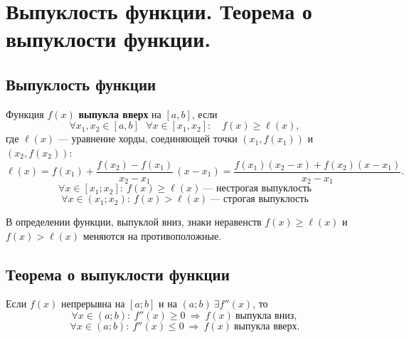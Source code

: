 \section{Выпуклость функции. Теорема о выпуклости функции.}
\subsection{Выпуклость функции}
\begin{definition}
Функция $f(x)$ \textbf{выпукла вверх} на $[a,b]$, если
\[
\forall x_1,x_2\in[a,b]\text{ } \forall x\in[x_1,x_2]:
\quad f(x)\ge \ell(x),
\]
где $\ell(x)$ — уравнение хорды, соединяющей точки $(x_1,f(x_1))$ и $(x_2,f(x_2))$:
\[
\ell(x)=f(x_1)+\frac{f(x_2)-f(x_1)}{x_2-x_1}\,(x-x_1)
      =\frac{f(x_1)(x_2-x)+f(x_2)(x-x_1)}{x_2-x_1}.
\]
\[
\forall x\in[x_1;x_2]:\ f(x)\ge \ell(x)\ \text{— нестрогая выпуклость}
\]
\[
\forall x\in(x_1;x_2):\ f(x)>\ell(x)\ \text{— строгая выпуклость}
\]

В определении функции, выпуклой вниз, знаки неравенств
$f(x)\ge \ell(x)$ и $f(x)>\ell(x)$ меняются на противоположные.
\end{definition}

\subsection{Теорема о выпуклости функции}
\begin{theorem}
Если $f(x)$ непрерывна на $[a;b]$ и на $(a;b)\ \exists f''(x)$, то
\[
\forall x\in(a;b):\ f''(x)\ge 0 \ \Longrightarrow\ f(x)\ \text{выпукла вниз},
\]
\[
\forall x\in(a;b):\ f''(x)\le 0 \ \Longrightarrow\ f(x)\ \text{выпукла вверх}.
\]
\end{theorem}


